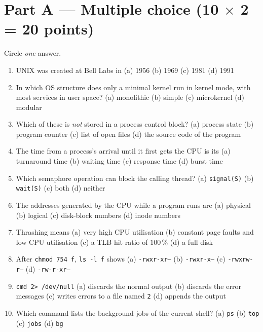 \section*{Part A --- Multiple choice \hfill (10 $\times$ 2 = 20 points)}
Circle \emph{one} answer.
\begin{enumerate}[leftmargin=1.8em,label=A\arabic*.,itemsep=0.35em]
  \item UNIX was created at Bell Labs in \quad (a) 1956 \quad (b) 1969 \quad (c) 1981 \quad (d) 1991
  \item In which OS structure does only a minimal kernel run in kernel mode, with most services in user space? \quad (a) monolithic \quad (b) simple \quad (c) microkernel \quad (d) modular
  \item Which of these is \emph{not} stored in a process control block? \quad (a) process state \quad (b) program counter \quad (c) list of open files \quad (d) the source code of the program
  \item The time from a process's arrival until it first gets the CPU is its \quad (a) turnaround time \quad (b) waiting time \quad (c) response time \quad (d) burst time
  \item Which semaphore operation can block the calling thread? \quad (a) \texttt{signal(S)} \quad (b) \texttt{wait(S)} \quad (c) both \quad (d) neither
  \item The addresses generated by the CPU while a program runs are \quad (a) physical \quad (b) logical \quad (c) disk-block numbers \quad (d) inode numbers
  \item Thrashing means \quad (a) very high CPU utilisation \quad (b) constant page faults and low CPU utilisation \quad (c) a TLB hit ratio of $100\,\%$ \quad (d) a full disk
  \item After \texttt{chmod 754 f}, \texttt{ls -l f} shows \quad (a) \texttt{-rwxr-xr--} \quad (b) \texttt{-rwxr-x---} \quad (c) \texttt{-rwxrw-r--} \quad (d) \texttt{-rw-r-xr--}
  \item \texttt{cmd 2> /dev/null} \quad (a) discards the normal output \quad (b) discards the error messages \quad (c) writes errors to a file named \texttt{2} \quad (d) appends the output
  \item Which command lists the background jobs of the current shell? \quad (a) \texttt{ps} \quad (b) \texttt{top} \quad (c) \texttt{jobs} \quad (d) \texttt{bg}
\end{enumerate}

